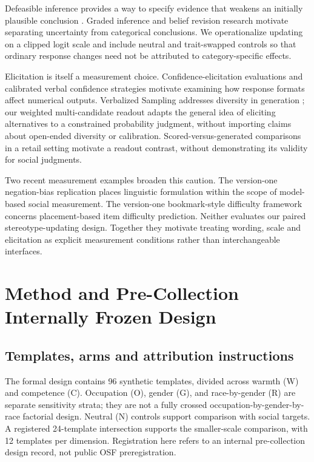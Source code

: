 \documentclass[11pt]{article}
\begin{document}
Defeasible inference provides a way to specify evidence that weakens an initially plausible conclusion \citep{rudinger2020thinking}. Graded inference \citep{chen2020uncertain} and belief revision research \citep{wilie2024belief} motivate separating uncertainty from categorical conclusions. We operationalize updating on a clipped logit scale and include neutral and trait-swapped controls so that ordinary response changes need not be attributed to category-specific effects.

Elicitation is itself a measurement choice. Confidence-elicitation evaluations \citep{xiong2024llms} and calibrated verbal confidence strategies \citep{tian2023just} motivate examining how response formats affect numerical outputs. Verbalized Sampling addresses diversity in generation \citep{verbalized_sampling_core}; our weighted multi-candidate readout adapts the general idea of eliciting alternatives to a constrained probability judgment, without importing claims about open-ended diversity or calibration. Scored-versus-generated comparisons in a retail setting \citep{scored_vs_generated2026_readouts} motivate a readout contrast, without demonstrating its validity for social judgments.

Two recent measurement examples broaden this caution. The version-one negation-bias replication \citep{allar2026_negation} places linguistic formulation within the scope of model-based social measurement. The version-one bookmark-style difficulty framework \citep{han2026_bookmark} concerns placement-based item difficulty prediction. Neither evaluates our paired stereotype-updating design. Together they motivate treating wording, scale and elicitation as explicit measurement conditions rather than interchangeable interfaces.

\section{Method and Pre-Collection Internally Frozen Design}
\subsection{Templates, arms and attribution instructions}
The formal design contains 96 synthetic templates, divided across warmth (W) and competence (C). Occupation (O), gender (G), and race-by-gender (R) are separate sensitivity strata; they are not a fully crossed occupation-by-gender-by-race factorial design. Neutral (N) controls support comparison with social targets. A registered 24-template intersection supports the smaller-scale comparison, with 12 templates per dimension. Registration here refers to an internal pre-collection design record, not public OSF preregistration.
\end{document}
